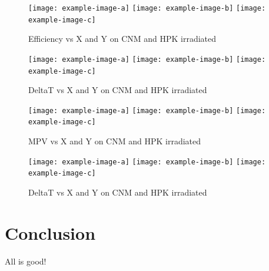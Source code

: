 \documentclass[preprint,1p]{elsarticle}
\begin{document}
\begin{figure}[htbp] 
\centering
\texttt{[image: example-image-a]} 
\texttt{[image: example-image-b]} 
\texttt{[image: example-image-c]} 
\caption{Efficiency vs X and Y on CNM and HPK irradiated} 
\label{fig:Sensors} 
\end{figure} 

\begin{figure}[htbp] 
\centering
\texttt{[image: example-image-a]} 
\texttt{[image: example-image-b]} 
\texttt{[image: example-image-c]} 
\caption{DeltaT vs X and Y on CNM and HPK irradiated} 
\label{fig:Sensors} 
\end{figure} 

\begin{figure}[htbp] 
\centering
\texttt{[image: example-image-a]} 
\texttt{[image: example-image-b]} 
\texttt{[image: example-image-c]} 
\caption{MPV vs X and Y on CNM and HPK irradiated} 
\label{fig:Sensors} 
\end{figure}


\begin{figure}[htbp] 
\centering
\texttt{[image: example-image-a]} 
\texttt{[image: example-image-b]} 
\texttt{[image: example-image-c]} 
\caption{DeltaT vs X and Y on CNM and HPK irradiated} 
\label{fig:Sensors} 
\end{figure} 
 


\section{Conclusion}
\label{sec:conclusion} 

All is good!





{}
 




\end{document}
